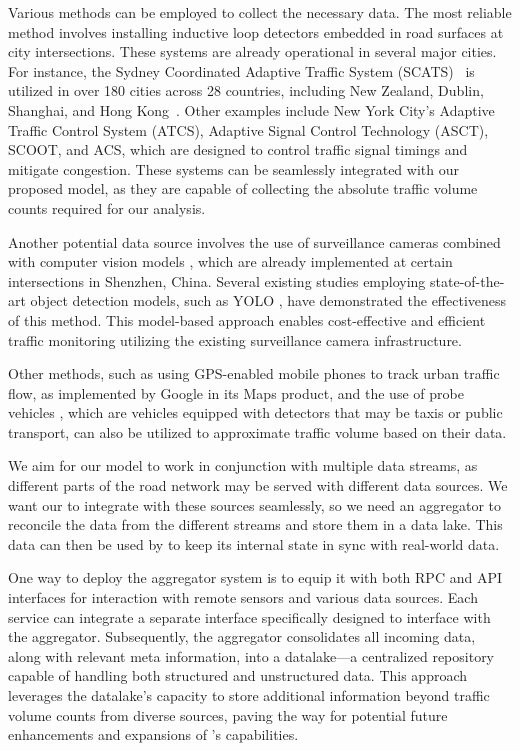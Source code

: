 Various methods can be employed to collect the necessary data. The most reliable method involves installing inductive loop detectors embedded in road surfaces at city intersections. These systems are already operational in several major cities. For instance, the Sydney Coordinated Adaptive Traffic System (SCATS)~\cite{scats} is utilized in over 180 cities across 28 countries, including New Zealand, Dublin, Shanghai, and Hong Kong~\cite{wiki:sydney_traffic_system}. Other examples include New York City's Adaptive Traffic Control System (ATCS), Adaptive Signal Control Technology (ASCT), SCOOT, and ACS, which are designed to control traffic signal timings and mitigate congestion. These systems can be seamlessly integrated with our proposed model, as they are capable of collecting the absolute traffic volume counts required for our analysis.

Another potential data source involves the use of surveillance cameras combined with computer vision models \cite{jain2019review}, which are already implemented at certain intersections in Shenzhen, China. Several existing studies \cite{asha2018vehicle} employing state-of-the-art object detection models, such as YOLO \cite{redmon2018yolov3}, have demonstrated the effectiveness of this method. This model-based approach enables cost-effective and efficient traffic monitoring utilizing the existing surveillance camera infrastructure.


Other methods, such as using GPS-enabled mobile phones \cite{rose2006mobile} to track urban traffic flow, as implemented by Google in its Maps product, and the use of probe vehicles \cite{zhu2012probe}, which are vehicles equipped with detectors that may be taxis or public transport, can also be utilized to approximate traffic volume based on their data.

We aim for our model to work in conjunction with multiple data streams, as different parts of the road network may be served with different data sources. We want our \name to integrate with these sources seamlessly, so we need an aggregator to reconcile the data from the different streams and store them in a data lake. This data can then be used by \name to keep its internal state in sync with real-world data.

One way to deploy the aggregator system is to equip it with both RPC and API interfaces for interaction with remote sensors and various data sources. Each service can integrate a separate interface specifically designed to interface with the aggregator. Subsequently, the aggregator consolidates all incoming data, along with relevant meta information, into a datalake—a centralized repository capable of handling both structured and unstructured data. This approach leverages the datalake's capacity to store additional information beyond traffic volume counts from diverse sources, paving the way for potential future enhancements and expansions of \name's capabilities.

